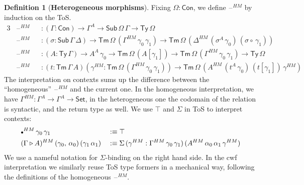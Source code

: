 \documentclass[12pt,a4paper,twoside,openany]{book}
\theoremstyle{remark}
\theoremstyle{definition}
\newtheorem{mydefinition}{Definition}
\theoremstyle{theorem}
\newcommand{\Con}{\mathsf{Con}}
\newcommand{\Sub}{\mathsf{Sub}}
\newcommand{\Tm}{\mathsf{Tm}}
\newcommand{\Ty}{\mathsf{Ty}}
\newcommand{\blank}{\mathord{\hspace{1pt}\text{--}\hspace{1pt}}}
\newcommand{\Set}{\mathsf{Set}}
\newcommand{\ext}{\triangleright}
\newcommand{\emptycon}{\scaleobj{.75}\bullet}
\newcommand{\defn}{:\equiv}
\begin{document}
\begin{mydefinition}[\textbf{Heterogeneous morphisms}]
Fixing $\Omega : \Con$, we define $\blank^{HM}$ by induction on the ToS.
\begin{alignat*}{3}
  &\blank^{HM} &&: (\Gamma : \Con) \to \Gamma^A \to \Sub\,\Omega\,\Gamma \to \Ty\,\Omega\\
  &\blank^{HM} &&: (\sigma : \Sub\,\Gamma\,\Delta) \to \Tm\,\Omega\,(\Gamma^{HM}\,\gamma_0\,\gamma_1) \to \Tm\,\Omega\,(\Delta^{HM}\,(\sigma^A\,\gamma_0)\,(\sigma \circ\,\gamma_1))\\
  &\blank^{HM} &&: (A : \Ty\,\Gamma) \to A^A\,\gamma_0 \to \Tm\,\Omega\,(A[\gamma_1])
  \to \Tm\,\Omega\,(\Gamma^{HM}\,\gamma_0\,\gamma_1) \to \Ty\,\Omega\\
  &\blank^{HM} &&: (t : \Tm\,\Gamma\,A)(\gamma^{HM} : \Tm\,\Omega\,(\Gamma^{HM}\,\gamma_0\,\gamma_1))
   \to \Tm\,\Omega\,(A^{HM}\,(t^A\,\gamma_0)\,(t[\gamma_1])\,\gamma^{HM})
\end{alignat*}
The interpretation on contexts sums up the difference between the
``homogeneous'' $\blank^{HM}$ and the current one. In the homogeneous
interpretation, we have $\Gamma^{HM} : \Gamma^A \to \Gamma^A \to \Set$, in the
heterogeneous one the codomain of the relation is syntactic, and the return type
as well. We use $\top$ and $\Sigma$ in ToS to interpret contexts:
\begin{alignat*}{3}
  &\emptycon^{HM}\,\gamma_0\,\gamma_1 &&\defn \top\\
  &(\Gamma\ext A)^{HM}\,(\gamma_0,\,\alpha_0)\,(\gamma_1\,\alpha_1) &&\defn
    \Sigma\,(\gamma^{HM} : \Gamma^{HM}\,\gamma_0\,\gamma_1)\,(A^{HM}\,\alpha_0\,\alpha_1\,\gamma^{HM})
\end{alignat*}
We use a nameful notation for $\Sigma$-binding on the right hand side. In the
cwf interpretation we similarly reuse ToS type formers in a mechanical way,
following the definitions of the homogeneous $\blank^{HM}$.


\end{mydefinition}
\end{document}
